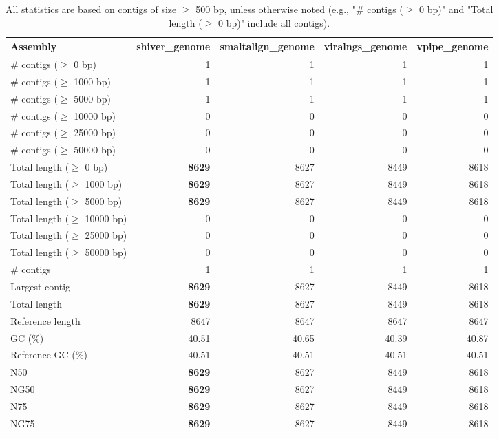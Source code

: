 \documentclass[12pt,a4paper]{article}
\begin{document}
\begin{table}[ht]
\begin{center}
\caption{All statistics are based on contigs of size $\geq$ 500 bp, unless otherwise noted (e.g., "\# contigs ($\geq$ 0 bp)" and "Total length ($\geq$ 0 bp)" include all contigs).}
\begin{tabular}{|l*{4}{|r}|}
\hline
Assembly & shiver\_genome & smaltalign\_genome & viralngs\_genome & vpipe\_genome \\ \hline
\# contigs ($\geq$ 0 bp) & 1 & 1 & 1 & 1 \\ \hline
\# contigs ($\geq$ 1000 bp) & 1 & 1 & 1 & 1 \\ \hline
\# contigs ($\geq$ 5000 bp) & 1 & 1 & 1 & 1 \\ \hline
\# contigs ($\geq$ 10000 bp) & 0 & 0 & 0 & 0 \\ \hline
\# contigs ($\geq$ 25000 bp) & 0 & 0 & 0 & 0 \\ \hline
\# contigs ($\geq$ 50000 bp) & 0 & 0 & 0 & 0 \\ \hline
Total length ($\geq$ 0 bp) & {\bf 8629} & 8627 & 8449 & 8618 \\ \hline
Total length ($\geq$ 1000 bp) & {\bf 8629} & 8627 & 8449 & 8618 \\ \hline
Total length ($\geq$ 5000 bp) & {\bf 8629} & 8627 & 8449 & 8618 \\ \hline
Total length ($\geq$ 10000 bp) & 0 & 0 & 0 & 0 \\ \hline
Total length ($\geq$ 25000 bp) & 0 & 0 & 0 & 0 \\ \hline
Total length ($\geq$ 50000 bp) & 0 & 0 & 0 & 0 \\ \hline
\# contigs & 1 & 1 & 1 & 1 \\ \hline
Largest contig & {\bf 8629} & 8627 & 8449 & 8618 \\ \hline
Total length & {\bf 8629} & 8627 & 8449 & 8618 \\ \hline
Reference length & 8647 & 8647 & 8647 & 8647 \\ \hline
GC (\%) & 40.51 & 40.65 & 40.39 & 40.87 \\ \hline
Reference GC (\%) & 40.51 & 40.51 & 40.51 & 40.51 \\ \hline
N50 & {\bf 8629} & 8627 & 8449 & 8618 \\ \hline
NG50 & {\bf 8629} & 8627 & 8449 & 8618 \\ \hline
N75 & {\bf 8629} & 8627 & 8449 & 8618 \\ \hline
NG75 & {\bf 8629} & 8627 & 8449 & 8618 \\ \hline

\end{tabular}
\end{center}
\end{table}
\end{document}
